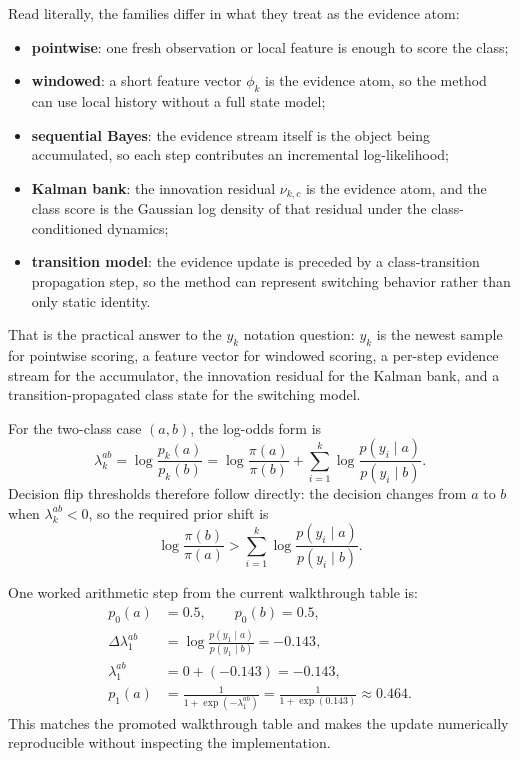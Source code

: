 \documentclass[11pt]{article}
\begin{document}
Read literally, the families differ in what they treat as the evidence atom:
\begin{itemize}[leftmargin=1.5em]
  \item \textbf{pointwise}: one fresh observation or local feature is enough to score the class;
  \item \textbf{windowed}: a short feature vector \(\phi_k\) is the evidence atom, so the method can use local history without a full state model;
  \item \textbf{sequential Bayes}: the evidence stream itself is the object being accumulated, so each step contributes an incremental log-likelihood;
  \item \textbf{Kalman bank}: the innovation residual \(\nu_{k,c}\) is the evidence atom, and the class score is the Gaussian log density of that residual under the class-conditioned dynamics;
  \item \textbf{transition model}: the evidence update is preceded by a class-transition propagation step, so the method can represent switching behavior rather than only static identity.
\end{itemize}
That is the practical answer to the \(y_k\) notation question: \(y_k\) is the newest sample for pointwise scoring, a feature vector for windowed scoring, a per-step evidence stream for the accumulator, the innovation residual for the Kalman bank, and a transition-propagated class state for the switching model.

For the two-class case \((a,b)\), the log-odds form is
\begin{equation}
\lambda_k^{ab}
=
\log \frac{p_k(a)}{p_k(b)}
=
\log \frac{\pi(a)}{\pi(b)}
+ \sum_{i=1}^k \log \frac{p(y_i \mid a)}{p(y_i \mid b)}.
\end{equation}
Decision flip thresholds therefore follow directly: the decision changes from \(a\) to \(b\) when \(\lambda_k^{ab} < 0\), so the required prior shift is
\begin{equation}
\log \frac{\pi(b)}{\pi(a)}
>
\sum_{i=1}^k \log \frac{p(y_i \mid a)}{p(y_i \mid b)}.
\end{equation}

One worked arithmetic step from the current walkthrough table is:
\begin{align}
p_0(a) &= 0.5, \qquad p_0(b) = 0.5, \\
\Delta \lambda_1^{ab} &= \log \frac{p(y_1 \mid a)}{p(y_1 \mid b)} = -0.143, \\
\lambda_1^{ab} &= 0 + (-0.143) = -0.143, \\
p_1(a) &= \frac{1}{1+\exp(-\lambda_1^{ab})} = \frac{1}{1+\exp(0.143)} \approx 0.464.
\end{align}
This matches the promoted walkthrough table and makes the update numerically reproducible without inspecting the implementation.
\end{document}
